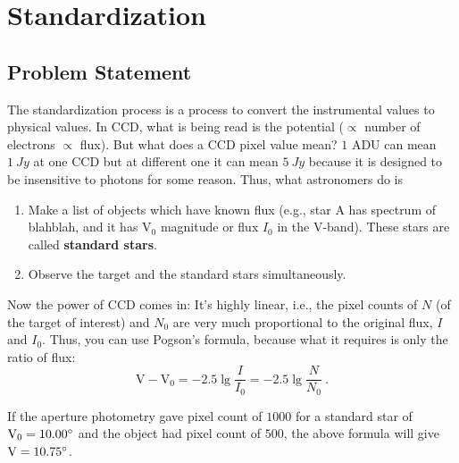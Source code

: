 \chapter{Standardization}

\section{Problem Statement}
The standardization process is a process to convert the instrumental values to physical values. In CCD, what is being read is the potential ($ \propto $ number of electrons $ \propto $ flux). But what does a CCD pixel value mean? $ 1 $ ADU can mean $ \SI{1}{Jy} $ at one CCD but at different one it can mean $ \SI{5}{Jy} $ because it is designed to be insensitive to photons for some reason. Thus, what astronomers do is

\begin{enumerate}
\item Make a list of objects which have known flux (e.g., star A has spectrum of blahblah, and it has $ \mathrm{V}_0 $ magnitude or flux $ I_0 $ in the V-band). These stars are called \textbf{standard stars}.
\item Observe the target and the standard stars simultaneously. 
\end{enumerate}
Now the power of CCD comes in: It's highly linear, i.e., the pixel counts of $ N $ (of the target of interest) and $ N_0 $ are very much proportional to the original flux, $ I $ and $ I_0 $. Thus, you can use Pogson's formula, because what it requires is only the ratio of flux: 
\begin{equation}\label{eq: Pogson}
  \mathrm{V} - \mathrm{V}_0 = -2.5 \lg \frac{I}{I_0} =  -2.5 \lg \frac{N}{N_0} ~.
\end{equation}

\begin{ex}
If the aperture photometry gave pixel count of $ 1000 $ for a standard star of $ \mathrm{V}_0 = \m{10.00} $ and the object had pixel count of $ 500 $, the above formula will give $ \mathrm{V} = \m{10.75} $. 
\end{ex}

